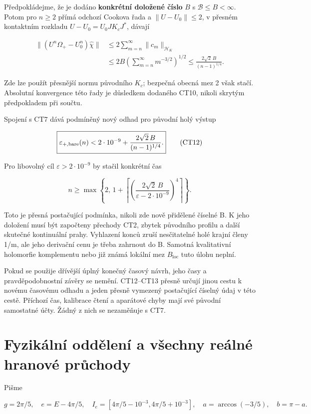 \documentclass[11pt,a4paper]{article}
\theoremstyle{remark}\newtheorem{remark}[theorem]{Poznámka}
\numberwithin{equation}{section}
\begin{document}
Předpokládejme, že je dodáno \textbf{konkrétní doložené číslo} \(B\) s
\(\mathcal B\le B<\infty\). Potom pro \(n\ge2\) přímá odchozí Cookova
řada a \(\|U-U_0\|\le2\), v přesném kontaktním rozkladu
\(U-U_0=U_0JK_cJ^*\), dávají

\[
\begin{aligned}
\|(U^n\Omega_+-U_0^n)\widehat\chi\|
&\le2\sum_{m=n}^{\infty}\|c_m\|_{\mathcal H_K}\\
&\le2B\left(\sum_{m=n}^{\infty}m^{-3/2}\right)^{1/2}
\le\frac{2\sqrt2\,B}{(n-1)^{1/4}}.
\end{aligned}
\tag{CT11}
\]

Zde lze použít přesnější normu původního \(K_c\); bezpečná obecná mez 2
však stačí. Absolutní konvergence této řady je důsledkem dodaného CT10,
nikoli skrytým předpokladem při součtu.

Spojení s CT7 dává podmíněný nový odhad pro původní holý výstup

\[
\boxed{
\varepsilon_{+,\rm bare}(n)
<2\cdot10^{-9}+
\frac{2\sqrt2\,B}{(n-1)^{1/4}}.}
\tag{CT12}
\]

Pro libovolný cíl \(\varepsilon>2\cdot10^{-9}\) by stačil konkrétní čas

\[
n\ge\max\left\{2,\,
1+\left\lceil
\left(\frac{2\sqrt2\,B}{\varepsilon-2\cdot10^{-9}}\right)^4
\right\rceil\right\}.
\tag{CT13}
\]

Toto je přesná postačující podmínka, nikoli zde nově přidělené číselné
B. K jeho doložení musí být započteny přechody CT2, zbytek původního
profilu a další skutečné kontinuální prahy. Vyhlazení konců zruší
nesčitatelné holé krajní členy 1/m, ale jeho derivační cenu je třeba
zahrnout do B. Samotná kvalitativní holomorfie komplementu nebo již
známá lokální mez \(B_{\mathrm{loc}}\) tuto úlohu neplní.

Pokud se použije dřívější úplný konečný časový návrh, jeho časy a
pravděpodobnostní závěry se nemění. CT12--CT13 přesně určují jinou cestu
k novému časovému odhadu a jeden přesně vymezený postačující číselný
údaj v této cestě. Příchozí čas, kalibrace čtení a aparátové chyby mají
své původní samostatné účty. Žádný z nich se nezaměňuje s CT7.

\clearpage
\section{Fyzikální oddělení a všechny reálné hranové průchody}
Pišme

\[
g=2\pi/5,\quad e=E-4\pi/5,\quad
I_e=[4\pi/5-10^{-3},4\pi/5+10^{-3}],\quad
a=\arccos(-3/5),\quad b=\pi-a.
\tag{CG1}
\]
\end{document}

